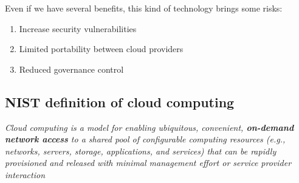\documentclass{article}
\begin{document}
Even if we have several benefits, this kind of technology brings some risks:
\begin{enumerate}
    \item Increase security vulnerabilities
    \item Limited portability between cloud providers
    \item Reduced governance control
\end{enumerate}

\subsection{NIST definition of cloud computing}

\textit{Cloud computing is a model for enabling ubiquitous,
convenient, \textbf{on-demand network access} to a shared pool of
configurable computing resources (e.g., networks, servers,
storage, applications, and services) that can be rapidly
provisioned and released with minimal management effort or
service provider interaction}
\end{document}
